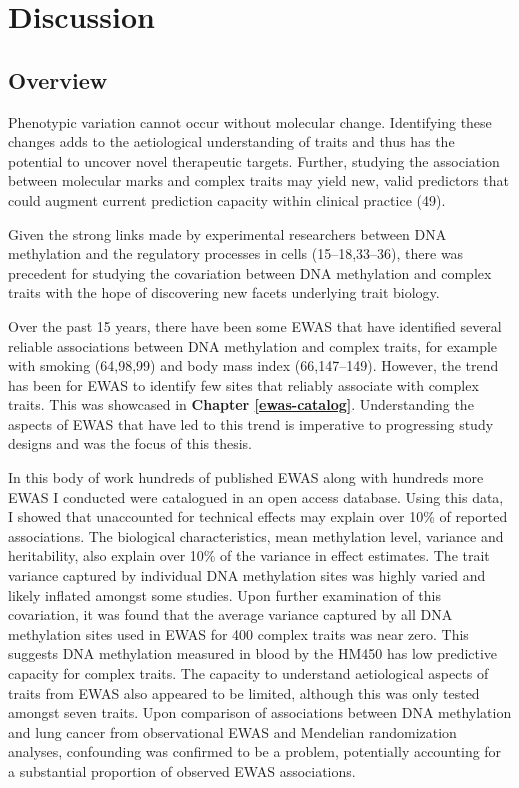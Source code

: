 \documentclass[11pt,oneside]{bristolthesis}
\begin{document}
\hypertarget{discussion-thesis}{%
\chapter{Discussion}\label{discussion-thesis}}

\hypertarget{overview-08}{%
\section{Overview}\label{overview-08}}

Phenotypic variation cannot occur without molecular change. Identifying these changes adds to the aetiological understanding of traits and thus has the potential to uncover novel therapeutic targets. Further, studying the association between molecular marks and complex traits may yield new, valid predictors that could augment current prediction capacity within clinical practice (49).

Given the strong links made by experimental researchers between DNA methylation and the regulatory processes in cells (15--18,33--36), there was precedent for studying the covariation between DNA methylation and complex traits with the hope of discovering new facets underlying trait biology.

Over the past 15 years, there have been some EWAS that have identified several reliable associations between DNA methylation and complex traits, for example with smoking (64,98,99) and body mass index (66,147--149). However, the trend has been for EWAS to identify few sites that reliably associate with complex traits. This was showcased in \textbf{Chapter \ref{ewas-catalog}}. Understanding the aspects of EWAS that have led to this trend is imperative to progressing study designs and was the focus of this thesis.

In this body of work hundreds of published EWAS along with hundreds more EWAS I conducted were catalogued in an open access database. Using this data, I showed that unaccounted for technical effects may explain over 10\% of reported associations. The biological characteristics, mean methylation level, variance and heritability, also explain over 10\% of the variance in effect estimates. The trait variance captured by individual DNA methylation sites was highly varied and likely inflated amongst some studies. Upon further examination of this covariation, it was found that the average variance captured by all DNA methylation sites used in EWAS for 400 complex traits was near zero. This suggests DNA methylation measured in blood by the HM450 has low predictive capacity for complex traits. The capacity to understand aetiological aspects of traits from EWAS also appeared to be limited, although this was only tested amongst seven traits. Upon comparison of associations between DNA methylation and lung cancer from observational EWAS and Mendelian randomization analyses, confounding was confirmed to be a problem, potentially accounting for a substantial proportion of observed EWAS associations.
\end{document}

